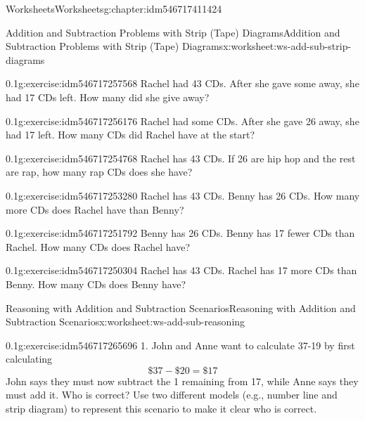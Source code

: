 \documentclass[twoside,11pt,]{book}
\begin{document}
\begin{chapterptx}{Worksheets}{}{Worksheets}{}{}{g:chapter:idm546717411424}
\begin{worksheet-section-numberless}{Addition and Subtraction Problems with Strip (Tape) Diagrams}{}{Addition and Subtraction Problems with Strip (Tape) Diagrams}{}{}{x:worksheet:ws-add-sub-strip-diagrams}
\begin{divisionexercise}{2}{}{0.1}{g:exercise:idm546717257568}
Rachel had 43 CDs.  After she gave some away, she had 17 CDs left.  How many did she give away?%
\end{divisionexercise}%
\begin{divisionexercise}{3}{}{0.1}{g:exercise:idm546717256176}%
Rachel had some CDs.  After she gave 26 away, she had 17 left.  How many CDs did Rachel have at the start?%
\end{divisionexercise}%
\begin{divisionexercise}{4}{}{0.1}{g:exercise:idm546717254768}%
Rachel has 43 CDs.  If 26 are hip hop and the rest are rap, how many rap CDs does she have?%
\end{divisionexercise}%
\begin{divisionexercise}{5}{}{0.1}{g:exercise:idm546717253280}%
Rachel has 43 CDs.  Benny has 26 CDs.  How many more CDs does Rachel have than Benny?%
\end{divisionexercise}%
\begin{divisionexercise}{6}{}{0.1}{g:exercise:idm546717251792}%
Benny has 26 CDs. Benny has 17 fewer CDs than Rachel.  How many CDs does Rachel have?%
\end{divisionexercise}%
\begin{divisionexercise}{7}{}{0.1}{g:exercise:idm546717250304}%
Rachel has 43 CDs. Rachel has 17 more CDs than Benny.  How many CDs does Benny have?%
\end{divisionexercise}%
\end{worksheet-section-numberless}
\restoregeometry
%
%
\typeout{************************************************}
\typeout{************************************************}
%
\begin{worksheet-section-numberless}{Reasoning with Addition and Subtraction Scenarios}{}{Reasoning with Addition and Subtraction Scenarios}{}{}{x:worksheet:ws-add-sub-reasoning}
\begin{divisionexercise}{1}{}{0.1}{g:exercise:idm546717265696}%
1.	John and Anne want to calculate \textdollar{}37-\textdollar{}19 by first calculating%
\begin{equation*}
\$37-\$20=\$17 
\end{equation*}
John says they must now subtract the \textdollar{}1 remaining from \textdollar{}17, while Anne says they must add it.  Who is correct?  Use two different models (e.g., number line and strip diagram) to represent this scenario to make it clear who is correct.%

\end{divisionexercise}
\end{worksheet-section-numberless}
\end{chapterptx}
\end{document}
